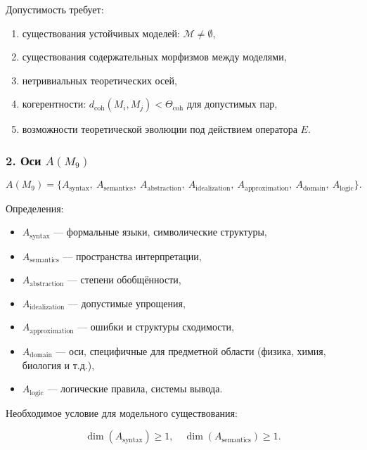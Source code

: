 Допустимость требует:

\begin{enumerate}
    \item существования устойчивых моделей: $\mathcal{M}\neq\emptyset$,
    \item существования содержательных морфизмов между моделями,
    \item нетривиальных теоретических осей,
    \item когерентности: $d_{\mathrm{coh}}(M_i, M_j)<\Theta_{\mathrm{coh}}$ для допустимых пар,
    \item возможности теоретической эволюции под действием оператора $E$.
\end{enumerate}

\subsubsection*{2. Оси \texorpdfstring{$A(M_9)$}{A(M_9)}}

\[
A(M_9)=
\{
A_{\mathrm{syntax}},\
A_{\mathrm{semantics}},\
A_{\mathrm{abstraction}},\
A_{\mathrm{idealization}},\
A_{\mathrm{approximation}},\
A_{\mathrm{domain}},\
A_{\mathrm{logic}}
\}.
\]

Определения:

\begin{itemize}
    \item $A_{\mathrm{syntax}}$ — формальные языки, символические структуры,
    \item $A_{\mathrm{semantics}}$ — пространства интерпретации,
    \item $A_{\mathrm{abstraction}}$ — степени обобщённости,
    \item $A_{\mathrm{idealization}}$ — допустимые упрощения,
    \item $A_{\mathrm{approximation}}$ — ошибки и структуры сходимости,
    \item $A_{\mathrm{domain}}$ — оси, специфичные для предметной области (физика, химия, биология и т.д.),
    \item $A_{\mathrm{logic}}$ — логические правила, системы вывода.
\end{itemize}

Необходимое условие для модельного существования:

\[
\dim(A_{\mathrm{syntax}})\ge 1,
\quad
\dim(A_{\mathrm{semantics}})\ge 1.
\]

